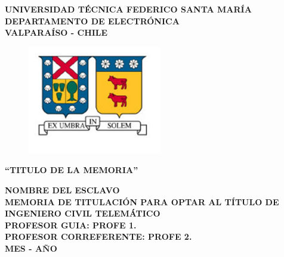 \documentclass[12pt,spanish,twoside]{thesis}
\begin{document}
\thispagestyle{empty}

\begin{center}
\linespread{1.15}
\textbf{\large{UNIVERSIDAD TÉCNICA FEDERICO SANTA MARÍA\\}
\normalsize{DEPARTAMENTO DE ELECTRÓNICA\\VALPARAÍSO - CHILE\\}}

\vspace{0.5cm}
\begin{figure}[H]
\centering
  \includegraphics[width=5.85cm]{fig/usmLogo}
\end{figure}
\vspace{0.5cm}

\linespread{1}\hangindent=0cm
\textbf{\Large ``TITULO DE LA MEMORIA''\\}
\vspace{3cm}

\hangindent=0cm\large \textbf{NOMBRE DEL ESCLAVO}\\
\vspace{0.5cm}
\hangindent=0cm\normalsize \textbf{MEMORIA DE TITULACIÓN PARA OPTAR AL TÍTULO DE INGENIERO CIVIL TELEMÁTICO}\\
\vspace{1cm}
\hangindent=0cm\normalsize \textbf{PROFESOR GUIA: \hspace{2cm} PROFE 1.}\\
\vspace{0.5cm}
\hangindent=0cm\normalsize \textbf{PROFESOR CORREFERENTE: \hspace{2cm} PROFE 2.}\\
\vspace{2cm}
\hangindent=0cm\normalsize \textbf{MES - A\~NO}\\

\end{center}
\thispagestyle{empty}

\newpage 
\thispagestyle{empty}

\renewcommand\headrulewidth{0pt}
\end{document}
